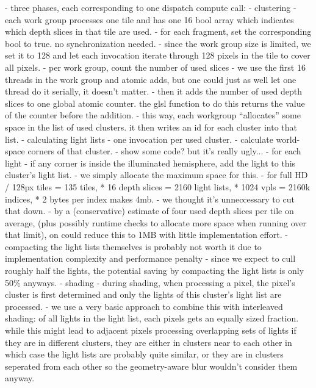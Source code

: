 - three phases, each corresponding to one dispatch compute call:
    - clustering
        - each work group processes one tile and has one 16 bool array which indicates which depth slices in that tile are used.
        - for each fragment, set the corresponding bool to true. no synchronization needed.
        - since the work group size is limited, we set it to 128 and let each invocation iterate through 128 pixels in the tile to cover all pixels.
        - per work group, count the number of used slices
            - we use the first 16 threads in the work group and atomic adds, but one could just as well let one thread do it serially, it doesn't matter.
        - then it adds the number of used depth slices to one global atomic counter. the glsl function to do this returns the value of the counter before the addition.
        - this way, each workgroup ``allocates'' some space in the list of used clusters. it then writes an id for each cluster into that list.
    - calculating light lists
        - one invocation per used cluster.
        - calculate world-space corners of that cluster.
        - show some code? but it's really ugly...
        - for each light
            - if any corner is inside the illuminated hemisphere, add the light to this cluster's light list.
        - we simply allocate the maximum space for this.
            - for full HD / 128px tiles = 135 tiles, * 16 depth slices = 2160 light lists, * 1024 vpls = 2160k indices, * 2 bytes per index makes 4mb.
            - we thought it's unneccessary to cut that down.
            - by a (conservative) estimate of four used depth slices per tile on average, (plus possibly runtime checks to allocate more space when running over that limit), on could reduce this to 1MB with little implementation effort.
            - compacting the light lists themselves is probably not worth it due to implementation complexity and performance penalty
            - since we expect to cull roughly half the lights, the potential saving by compacting the light lists is only 50\% anyways.
    - shading
        - during shading, when processing a pixel, the pixel's cluster is first determined and only the lights of this cluster's light list are processed.
        - we use a very basic approach to combine this with interleaved shading: of all lights in the light list, each pixels gets an equally sized fraction. while this might lead to adjacent pixels processing overlapping sets of lights if they are in different clusters, they are either in clusters near to each other in which case the light lists are probably quite similar, or they are in clusters seperated from each other so the geometry-aware blur wouldn't consider them anyway.
